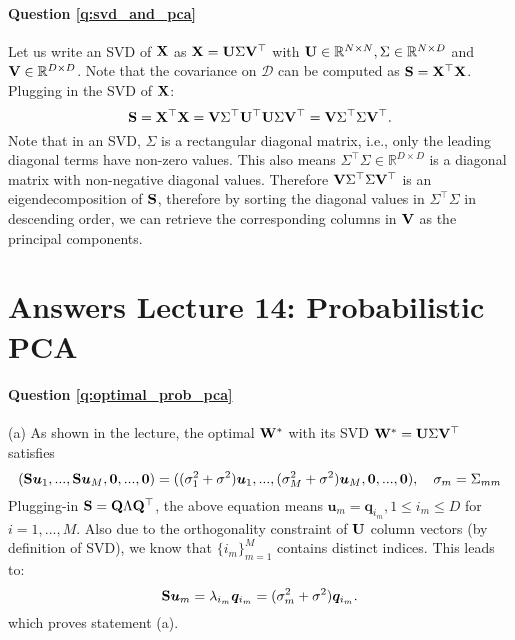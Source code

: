 \paragraph{Question \ref{q:svd_and_pca}}
Let us write an SVD of $\mathbf{X}$ as $\mathbf{X} = \mathbf U \Sigma \mathbf V^\top$ with $\mathbf U \in \mathbb{R}^{N \times N}, \Sigma \in \mathbb{R}^{N \times D}$ and $\mathbf V \in \mathbb{R}^{D \times D}$. Note that the covariance on $\mathcal{D}$ can be computed as $\mathbf{S} = \mathbf X^\top \mathbf X$. Plugging in the SVD of $\mathbf{X}$:
$$ \mathbf{S} = \mathbf X^\top \mathbf X = \mathbf V \Sigma^{\top} \mathbf U^\top \mathbf U \Sigma \mathbf V^\top = \mathbf V \Sigma^{\top} \Sigma \mathbf V^\top.$$
Note that in an SVD, $\Sigma$ is a rectangular diagonal matrix, i.e., only the leading diagonal terms have non-zero values. This also means $\Sigma^{\top} \Sigma \in \mathbb{R}^{D \times D}$ is a diagonal matrix with non-negative diagonal values. Therefore $\mathbf V \Sigma^{\top} \Sigma \mathbf V^\top$ is an eigendecomposition of $\mathbf{S}$, therefore by sorting the diagonal values in $\Sigma^{\top} \Sigma$ in descending order, we can retrieve the corresponding columns in $\mathbf V$ as the principal components.


\section{Answers Lecture 14: Probabilistic PCA}

\paragraph{Question \ref{q:optimal_prob_pca}}
(a) As shown in the lecture, the optimal $\mathbf W^*$ with its SVD $\mathbf W^* = \mathbf U \Sigma \mathbf V^\top$ satisfies
$$(\mathbf{S} \bm{u}_1, ..., \mathbf{S} \bm{u}_M, \bm{0}, ..., \bm{0}) = ((\sigma_1^2 + \sigma^2) \bm{u}_1, ..., (\sigma_M^2 + \sigma^2) \bm{u}_M, \bm{0}, ..., \bm{0}), \quad \sigma_m = \Sigma_{mm}$$
Plugging-in $\mathbf{S} = \mathbf{Q} \Lambda \mathbf{Q}^\top$, the above equation means $\bm{u}_m = \bm{q}_{i_m}, 1 \leq i_m \leq D$ for $i = 1, ..., M$. Also due to the orthogonality constraint of $\mathbf U$ column vectors (by definition of SVD), we know that $\{ i_m \}_{m=1}^M$ contains distinct indices. This leads to:
\begin{equation*}
\mathbf{S} \bm{u}_m = \lambda_{i_m} \bm{q}_{i_m} = (\sigma_m^2 + \sigma^2) \bm{q}_{i_m}.
\end{equation*}
which proves statement (a). 

